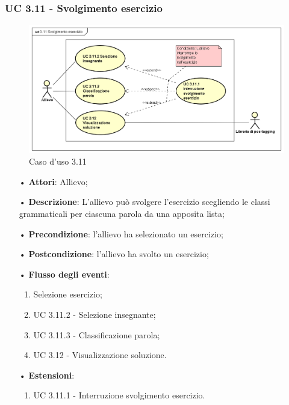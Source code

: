 \subsubsection{UC 3.11 - Svolgimento esercizio}
\begin{figure}[H]
	\centering
	\includegraphics[width=17cm]{img/UC311.png} 
	\caption{Caso d'uso 3.11}\label{fig:311}
\end{figure}
\begin{itemize}
	\item[•]\textbf{Attori}: Allievo;
	\item[•]\textbf{Descrizione}: L'allievo può svolgere l'esercizio scegliendo le classi grammaticali per ciascuna parola da una apposita lista;
	\item[•]\textbf{Precondizione}: l'allievo ha selezionato un esercizio;
	\item[•]\textbf{Postcondizione}: l'allievo ha svolto un esercizio;
	\item[•]\textbf{Flusso degli eventi}:
	\begin{enumerate}
		\item Selezione esercizio;
		\item UC 3.11.2 - Selezione insegnante;
		\item UC 3.11.3 - Classificazione parola;
		\item UC 3.12 - Visualizzazione soluzione.
	\end{enumerate}
	\item[•]\textbf{Estensioni}:
	\begin{enumerate}
		\item UC 3.11.1 - Interruzione svolgimento esercizio.
	\end{enumerate}
\end{itemize}

